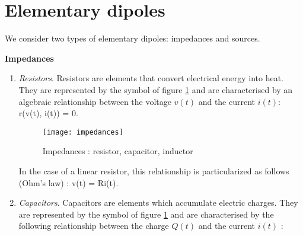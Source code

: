 \section{Elementary dipoles}

We consider two types of elementary dipoles: impedances and sources.
\begin{description}
\item{\bf Impedances}
\begin{enumerate}
\item {\em Resistors}. Resistors are elements that convert electrical energy into heat. They are represented by the symbol of figure \ref{fig:impedances}  and are characterised by an algebraic relationship between the voltage $v(t)$ and the current $i(t)$:
\eqnn
r(v(t), i(t)) = 0.
\eeqnn
\begin{figure}[t]
\begin{center}
\texttt{[image: impedances]}
\caption{Impedances : resistor, capacitor, inductor}
\label{fig:impedances}
\end{center}
\end{figure}
In the case of a linear resistor, this relationship is particularized as follows (Ohm's law) :
\eqnn
v(t) = Ri(t).
\eeqnn
\item {\em Capacitors}. Capacitors are elements which accumulate electric charges. They are represented by the symbol of figure \ref{fig:impedances} and are characterised by the following relationship between the charge $Q(t)$ and the current $i(t)$ :

\end{enumerate}
\end{description}
